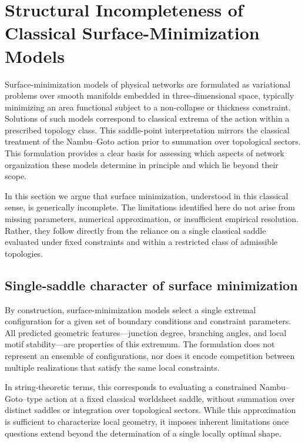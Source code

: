 \section{Structural Incompleteness of Classical Surface-Minimization Models}
\label{sec:incompleteness}

Surface-minimization models of physical networks are formulated as variational problems over smooth manifolds embedded in three-dimensional space, typically minimizing an area functional subject to a non-collapse or thickness constraint. Solutions of such models correspond to classical extrema of the action within a prescribed topology class.\cite{Meng2026SurfaceOptimization} This saddle-point interpretation mirrors the classical treatment of the Nambu--Goto action prior to summation over topological sectors.\cite{Polchinski1998} This formulation provides a clear basis for assessing which aspects of network organization these models determine in principle and which lie beyond their scope.

In this section we argue that surface minimization, understood in this classical sense, is generically incomplete. The limitations identified here do not arise from missing parameters, numerical approximation, or insufficient empirical resolution. Rather, they follow directly from the reliance on a single classical saddle evaluated under fixed constraints and within a restricted class of admissible topologies.

\subsection{Single-saddle character of surface minimization}

By construction, surface-minimization models select a single extremal configuration for a given set of boundary conditions and constraint parameters. All predicted geometric features---junction degree, branching angles, and local motif stability---are properties of this extremum. The formulation does not represent an ensemble of configurations, nor does it encode competition between multiple realizations that satisfy the same local constraints.

In string-theoretic terms, this corresponds to evaluating a constrained Nambu--Goto--type action at a fixed classical worldsheet saddle, without summation over distinct saddles or integration over topological sectors. While this approximation is sufficient to characterize local geometry, it imposes inherent limitations once questions extend beyond the determination of a single locally optimal shape.

